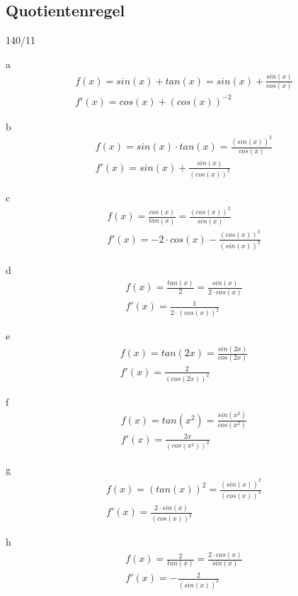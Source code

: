 \subsection{Quotientenregel}
\begin{exercise}{140/11}
  \item [a]
  \begin{gather*}
    f(x) = sin(x) + tan(x) = sin(x) + \frac{sin(x)}{cos(x)} \\
    f'(x) = cos(x) + (cos(x))^{-2}
  \end{gather*}
  \item [b]
  \begin{gather*}
    f(x) = sin(x) \cdot tan(x) = \frac{(sin(x))^2}{cos(x)} \\
    f'(x) = sin(x) + \frac{sin(x)}{(cos(x))^2}
  \end{gather*}
  \item [c]
  \begin{gather*}
    f(x) = \frac{cos(x)}{tan(x)} = \frac{(cos(x))^2}{sin(x)} \\
    f'(x) = -2 \cdot cos(x) - \frac{(cos(x))^3}{(sin(x))^2}
  \end{gather*}
  \item [d]
  \begin{gather*}
    f(x) = \frac{tan(x)}{2} = \frac{sin(x)}{2 \cdot cos(x)} \\
    f'(x) = \frac{1}{2 \cdot (cos(x))^2}
  \end{gather*}
  \item [e]
  \begin{gather*}
    f(x) = tan(2x) = \frac{sin(2x)}{cos(2x)} \\
    f'(x) = \frac{2}{(cos(2x))^2}
  \end{gather*}
  \item [f]
  \begin{gather*}
    f(x) = tan(x^2) = \frac{sin(x^2)}{cos(x^2)} \\
    f'(x) = \frac{2x}{(cos(x^2))^2}
  \end{gather*}
  \item [g]
  \begin{gather*}
    f(x) = (tan(x))^2 = \frac{(sin(x))^2}{(cos(x))^2} \\
    f'(x) = \frac{2 \cdot sin(x)}{(cos(x))^3}
  \end{gather*}
  \item [h]
  \begin{gather*}
    f(x) = \frac{2}{tan(x)} = \frac{2 \cdot cos(x)}{sin(x)} \\
    f'(x) = -\frac{2}{(sin(x))^2}
  \end{gather*}
\end{exercise}
